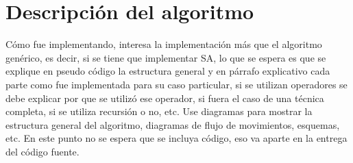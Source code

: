 \section{Descripción del algoritmo}

Cómo fue implementando, interesa la implementación más que el algoritmo genérico, es decir, si se tiene que implementar SA, lo que se espera es que se explique en pseudo código la estructura general y en párrafo explicativo cada parte como fue implementada para su caso particular, si se utilizan operadores se debe explicar por que se utilizó ese operador, si fuera el caso de una técnica completa, si se utiliza recursión o no, etc. Use diagramas para mostrar la estructura general del algoritmo, diagramas de flujo de movimientos, esquemas, etc. En este punto no se espera que se incluya código, eso va aparte en la entrega del código fuente.
